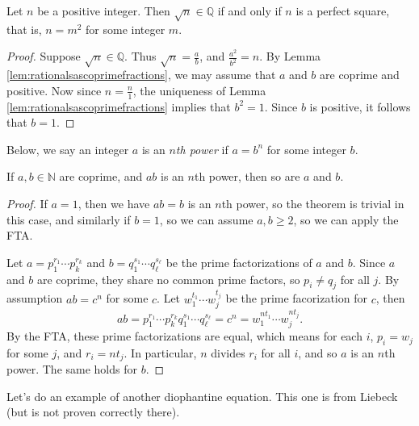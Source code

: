 \documentclass[11pt,dvipsnames]{book}
\numberwithin{equation}{section} %
\numberwithin{figure}{section} %
\numberwithin{table}{section} %
\begin{document}
\begin{theorem}
\label{t:perfectsquare}
 Let $n$ be a positive integer.  Then $\sqrt{n}\in\mathbb{Q}$ if and only if $n$ is a perfect square, that is, $n=m^2$ for some integer $m$.
 \end{theorem}
 
\begin{proof}
Suppose $\sqrt{n}\in\mathbb{Q}$.
Thus $\sqrt{n} = \frac{a}{b}$, and $\frac{a^2}{b^2} = n$.
By Lemma \ref{lem:rationalsascoprimefractions}, we may assume that $a$ and $b$ are coprime and positive.
Now since $n = \frac{n}{1}$, the uniqueness of Lemma \ref{lem:rationalsascoprimefractions} implies that $b^2=1$.
Since $b$ is positive, it follows that $b = 1$.
\end{proof}

Below, we say an integer $a$ is an {\it $n$th power} if $a=b^n$ for some integer $b$. 

\begin{theorem}
\label{t:abn}
If $a,b\in\mathbb{N}$ are coprime, and $ab$ is an $n$th power, then so are $a$ and $b$.
\end{theorem}

\begin{proof}
 If $a=1$, then we have $ab=b$ is an $n$th power, so the theorem is trivial in this case, and similarly if $b=1$, so we can assume $a,b \geq  2$, so we can apply the FTA.


Let $a=p_{1}^{r_{1}}\cdots p_{k}^{r_{k}}$ and $b=q_{1}^{s_{1}}\cdots q_{\ell}^{s_{\ell}}$ be the prime factorizations of $a$ and $b$. Since $a$ and $b$ are coprime, they share no common prime factors, so $p_{i}\neq q_{j}$ for all $j$.  By assumption $ab=c^n$ for some $c$. Let $w_{1}^{t_{1}}\cdots w_{j}^{t_{j}}$ be the prime facorization for $c$, then 
\[
ab = p_{1}^{r_{1}}\cdots p_{k}^{r_{k}}q_{1}^{s_{1}}\cdots q_{\ell}^{s_{\ell}}
=c^n=w_{1}^{nt_{1}}\cdots w_{j}^{nt_{j}}.
\]
By the FTA,  these prime factorizations are equal, which means for each $i$,  $p_{i}=w_{j}$ for some $j$, and $r_{i}=nt_{j}$. In particular, $n$ divides $r_{i}$ for all $i$, and so $a$ is an $n$th power. The same holds for $b$. 
\end{proof}


Let's do an example of another diophantine equation. This one is from Liebeck (but is not proven correctly there).
\end{document}
